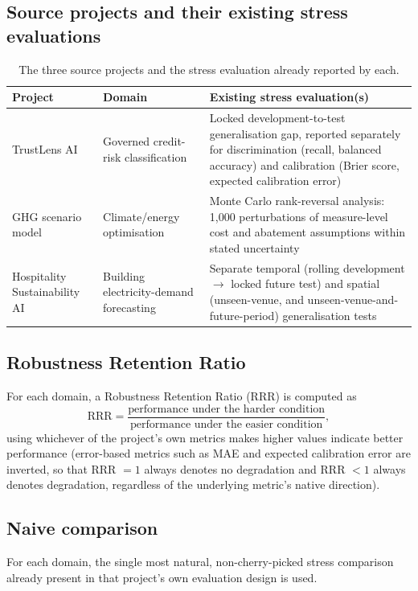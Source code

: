 \documentclass[11pt]{article}
\begin{document}
\subsection{Source projects and their existing stress evaluations}

\begin{table}[h]
\centering
\caption{The three source projects and the stress evaluation already reported by each.}
\begin{tabular}{@{}p{3.2cm}p{4.5cm}p{6.5cm}@{}}
\toprule
\textbf{Project} & \textbf{Domain} & \textbf{Existing stress evaluation(s)} \\
\midrule
TrustLens AI & Governed credit-risk classification & Locked development-to-test generalisation gap, reported separately for discrimination (recall, balanced accuracy) and calibration (Brier score, expected calibration error) \\
GHG scenario model & Climate/energy optimisation & Monte Carlo rank-reversal analysis: 1{,}000 perturbations of measure-level cost and abatement assumptions within stated uncertainty \\
Hospitality Sustainability AI & Building electricity-demand forecasting & Separate temporal (rolling development $\to$ locked future test) and spatial (unseen-venue, and unseen-venue-and-future-period) generalisation tests \\
\bottomrule
\end{tabular}
\end{table}

\subsection{Robustness Retention Ratio}

For each domain, a Robustness Retention Ratio (RRR) is computed as
\[
\text{RRR} = \frac{\text{performance under the harder condition}}{\text{performance under the easier condition}},
\]
using whichever of the project's own metrics makes higher values indicate better performance (error-based metrics such as MAE and expected calibration error are inverted, so that RRR $=1$ always denotes no degradation and RRR $<1$ always denotes degradation, regardless of the underlying metric's native direction).

\subsection{Naive comparison}

For each domain, the single most natural, non-cherry-picked stress comparison already present in that project's own evaluation design is used.
\end{document}

